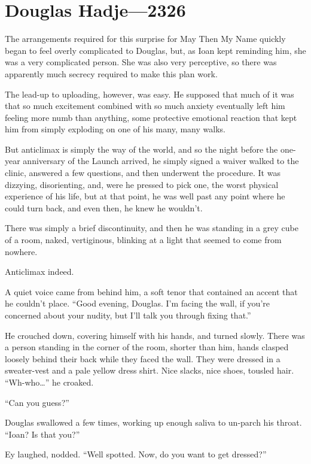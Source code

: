 \hypertarget{douglas-hadje-2326}{%
\chapter{Douglas Hadje---2326}\label{douglas-hadje-2326}}

The arrangements required for this surprise for May Then My Name quickly began to feel overly complicated to Douglas, but, as Ioan kept reminding him, she was a very complicated person. She was also very perceptive, so there was apparently much secrecy required to make this plan work.

The lead-up to uploading, however, was easy. He supposed that much of it was that so much excitement combined with so much anxiety eventually left him feeling more numb than anything, some protective emotional reaction that kept him from simply exploding on one of his many, many walks.

But anticlimax is simply the way of the world, and so the night before the one-year anniversary of the Launch arrived, he simply signed a waiver walked to the clinic, answered a few questions, and then underwent the procedure. It was dizzying, disorienting, and, were he pressed to pick one, the worst physical experience of his life, but at that point, he was well past any point where he could turn back, and even then, he knew he wouldn't.

There was simply a brief discontinuity, and then he was standing in a grey cube of a room, naked, vertiginous, blinking at a light that seemed to come from nowhere.

Anticlimax indeed.

A quiet voice came from behind him, a soft tenor that contained an accent that he couldn't place. ``Good evening, Douglas. I'm facing the wall, if you're concerned about your nudity, but I'll talk you through fixing that.''

He crouched down, covering himself with his hands, and turned slowly. There was a person standing in the corner of the room, shorter than him, hands clasped loosely behind their back while they faced the wall. They were dressed in a sweater-vest and a pale yellow dress shirt. Nice slacks, nice shoes, tousled hair. ``Wh-who\ldots{}'' he croaked.

``Can you guess?''

Douglas swallowed a few times, working up enough saliva to un-parch his throat. ``Ioan? Is that you?''

Ey laughed, nodded. ``Well spotted. Now, do you want to get dressed?''


